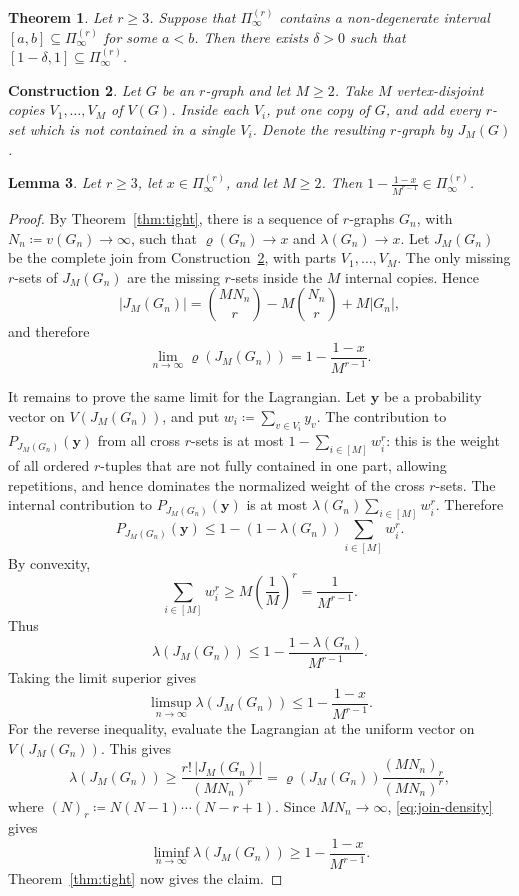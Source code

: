 \documentclass[10pt]{article}
\numberwithin{equation}{section}
\newtheorem{theorem}{Theorem}[section]
\newtheorem{lemma}[theorem]{Lemma}
\newtheorem{construction}[theorem]{Construction}
\begin{document}
\begin{theorem}\label{thm:terminal-from-interval} 
Let $r\ge 3$. Suppose that $\Pi^{(r)}_\infty$ contains a non-degenerate interval $[a,b]\subseteq\Pi^{(r)}_\infty$ for some $a < b$. Then there exists $\delta>0$ such that $[1-\delta,1]\subseteq\Pi^{(r)}_\infty$. 
\end{theorem}

\begin{construction}\label{con:complete-join} Let $G$ be an $r$-graph and let $M\ge 2$. Take $M$ vertex-disjoint copies $V_1,\ldots,V_M$ of $V(G)$. Inside each $V_i$, put one copy of $G$, and add every $r$-set which is not contained in a single $V_i$. Denote the resulting $r$-graph by $J_M(G)$. \end{construction}

\begin{lemma}\label{lem:complete-join} Let $r\ge 3$, let $x\in\Pi^{(r)}_\infty$, and let $M\ge 2$. Then $1-\frac{1-x}{M^{r-1}}\in\Pi^{(r)}_\infty$. \end{lemma}

\begin{proof}
By Theorem~\ref{thm:tight}, there is a sequence of $r$-graphs $G_n$, with $N_n\coloneqq v(G_n)\to\infty$, such that $\varrho(G_n)\to x$ and $\lambda(G_n)\to x$. Let $J_M(G_n)$ be the complete join from Construction~\ref{con:complete-join}, with parts $V_1,\ldots,V_M$.
The only missing $r$-sets of $J_M(G_n)$ are the missing $r$-sets inside the $M$ internal copies. Hence
\[
        |J_M(G_n)| =\binom{MN_n}{r}-M\binom{N_n}{r}+M |G_n|,
\]
and therefore
\begin{equation}
        \lim_{n\to\infty}\varrho(J_M(G_n)) = 1-\frac{1-x}{M^{r-1}}.
        \label{eq:join-density}
\end{equation}

It remains to prove the same limit for the Lagrangian. Let $\mathbf{y}$ be a probability vector on $V(J_M(G_n))$, and put $w_i\coloneqq \sum_{v\in V_i}y_v$. The contribution to $P_{J_M(G_n)}(\mathbf{y})$ from all cross $r$-sets is at most $1-\sum_{i\in[M]} w_i^r$: this is the weight of all ordered $r$-tuples that are not fully contained in one part, allowing repetitions, and hence dominates the normalized weight of the cross $r$-sets. The internal contribution to $P_{J_M(G_n)}(\mathbf{y})$ is at most $\lambda(G_n)\sum_{i\in[M]} w_i^r$. Therefore
\[
        P_{J_M(G_n)}(\mathbf{y}) \le 1-(1-\lambda(G_n))\sum_{i\in[M]} w_i^r.
\]
By convexity,
\[
        \sum_{i\in[M]} w_i^r\ge M\left(\frac1M\right)^r=\frac1{M^{r-1}}.
\]
Thus
\[
        \lambda(J_M(G_n))\le 1-\frac{1-\lambda(G_n)}{M^{r-1}}.
\]
Taking the limit superior gives
\[
        \limsup_{n\to\infty}\lambda(J_M(G_n))\le 1-\frac{1-x}{M^{r-1}}.
\]
For the reverse inequality, evaluate the Lagrangian at the uniform vector on $V(J_M(G_n))$. This gives
\[
        \lambda(J_M(G_n)) \ge \frac{r!\,|J_M(G_n)|}{(MN_n)^r} =\varrho(J_M(G_n))\frac{(MN_n)_r}{(MN_n)^r},
\]
where $(N)_r\coloneqq N(N-1)\cdots(N-r+1)$. Since $MN_n\to\infty$, \eqref{eq:join-density} gives
\[
        \liminf_{n\to\infty}\lambda(J_M(G_n))\ge 1-\frac{1-x}{M^{r-1}}.
\]
Theorem~\ref{thm:tight} now gives the claim.
\end{proof}
\end{document}
